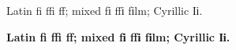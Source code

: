 \documentclass[10pt]{article}
\begin{document}
\noindent Latin fi ffi ff; mixed fі ffі fіlm; Cyrillic Іі.\par
\noindent \textbf{Latin fi ffi ff; mixed fі ffі fіlm; Cyrillic Іі.}
\end{document}

